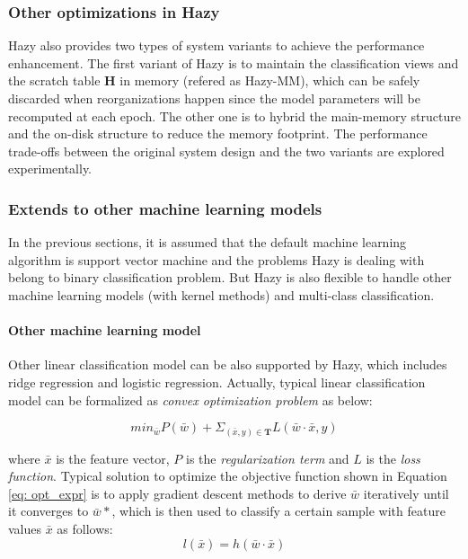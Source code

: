 \subsubsection{Other optimizations in Hazy}
Hazy also provides two types of system variants to achieve the performance enhancement. The first variant of Hazy is to maintain the classification views and the scratch table $\textbf{H}$ in memory (refered as Hazy-MM), which can be safely discarded when reorganizations happen since the model parameters will be recomputed at each epoch. The other one is to hybrid the main-memory structure and the on-disk structure to reduce the memory footprint. The performance trade-offs between the original system design and the two variants are explored experimentally.

\subsubsection{Extends to other machine learning models}
In the previous sections, it is assumed that the default machine learning algorithm is support vector machine and the problems Hazy is dealing with belong to binary classification problem. But Hazy is also flexible to handle other machine learning models (with kernel methods) and multi-class classification.

\paragraph{Other machine learning model}
Other linear classification model can be also supported by Hazy, which includes ridge regression and logistic regression. Actually, typical linear classification model can be formalized as {\em convex optimization problem} as below:

\begin{equation}\label{eq: opt_expr}
    min_{\bar{w}}P(\bar{w}) + \Sigma_{(\bar{x},y) \in \textbf{T}}L(\bar{w}\cdot\bar{x}, y)
\end{equation}

where $\bar{x}$ is the feature vector, $P$ is the {\em regularization term} and $L$ is the {\em loss function}. Typical solution to optimize the objective function shown in Equation \ref{eq: opt_expr} is to apply gradient descent methods to derive $\bar{w}$ iteratively until it converges to $\bar{w}*$, which is then used to classify a certain sample with feature values $\bar{x}$ as follows:
\begin{equation}
    l(\bar{x}) = h(\bar{w}\cdot\bar{x})
\end{equation}

